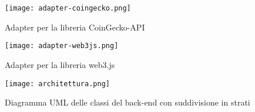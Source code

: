         \begin{figure}[h!]
            \centering
            \texttt{[image: adapter-coingecko.png]}
            \caption{Adapter per la libreria CoinGecko-API}
            \label{img:adapter-coingecko}
        \end{figure}

        \begin{figure}[h!]
            \centering
            \texttt{[image: adapter-web3js.png]}
            \caption{Adapter per la libreria web3.js}
            \label{img:adapter-web3js}
        \end{figure}


    \begin{landscape}
        \begin{figure}[p]
            \centering
            \hspace*{-4.5cm}
            \texttt{[image: architettura.png]}
            \caption{Diagramma UML delle classi del back-end con suddivisione in strati}
            \label{img:architettura}
        \end{figure}
    \end{landscape}